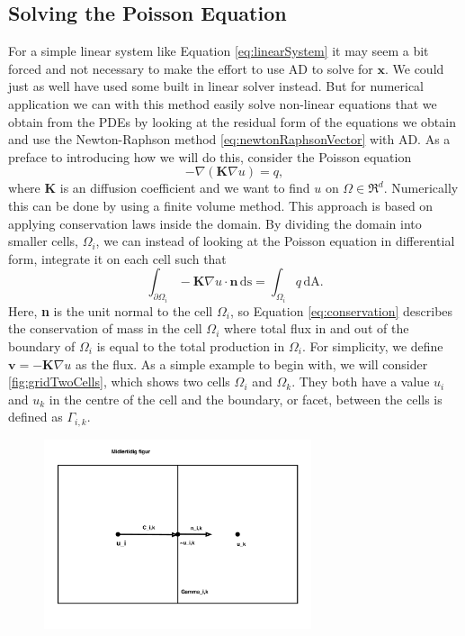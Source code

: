 \subsection{Solving the Poisson Equation}
For a simple linear system like Equation \eqref{eq:linearSystem} it may seem a bit forced and not necessary to make the effort to use AD to solve for $\boldsymbol{x}$. We could just as well have used some built in linear solver instead. But for numerical application we can with this method easily solve non-linear equations that we obtain from the PDEs by looking at the residual form of the equations we obtain and use the Newton-Raphson method \eqref{eq:newtonRaphsonVector} with AD.  As a preface to introducing how we will do this, consider the Poisson equation
\begin{equation}
    -\nabla(\textbf{K}\nabla u) = q,
    \label{eq:Poisson}
\end{equation}
where \textbf{K} is an diffusion coefficient and we want to find $u$ on $\Omega \in \Re^d$. Numerically this can be done by using a finite volume method. This approach is based on applying conservation laws inside the domain. By dividing the domain into smaller cells, $\Omega_i$, we can instead of looking at the Poisson equation in differential form, integrate it on each cell such that
\begin{equation}
    \int_{\partial\Omega_i} - \textbf{K} \nabla u \cdot \textbf{n}\, \mbox{ds} = \int_{\Omega_i} q \,\mbox{dA}.
    \label{eq:conservation}
\end{equation}
Here, \textbf{n} is the unit normal to the cell $\Omega_i$, so Equation \eqref{eq:conservation} describes the conservation of mass in the cell $\Omega_i$ where total flux in and out of the boundary of $\Omega_i$ is equal to the total production in $\Omega_i$. For simplicity, we define $\textbf{v} = - \textbf{K} \nabla u$ as the flux. As a simple example to begin with, we will consider \autoref{fig:gridTwoCells}, which shows two cells $\Omega_i$ and $\Omega_k$. They both have a value $u_i$ and $u_k$ in the centre of the cell and the boundary, or facet, between the cells is defined as $\Gamma_{i,k}$.
\begin{figure}[htb]
    \centering
    \includegraphics[width = 0.7\textwidth]{figures/grid_two_cells.pdf}
    \caption{}
    \label{fig:gridTwoCells}
\end{figure}

